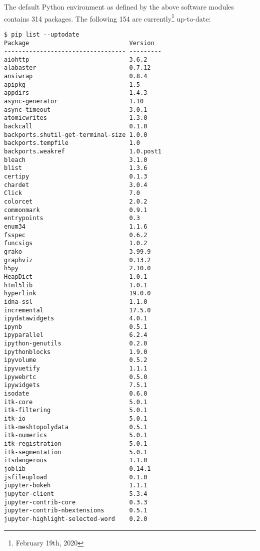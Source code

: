 \documentclass[11pt,a4paper]{article}
\begin{document}
The default Python environment as defined by the above software modules contains 314 packages.
The following 154 are currently\footnote{February 19th, 2020} up-to-date:
%
\begin{verbatim}
$ pip list --uptodate
Package                            Version
---------------------------------- ---------
aiohttp                            3.6.2
alabaster                          0.7.12
ansiwrap                           0.8.4
apipkg                             1.5
appdirs                            1.4.3
async-generator                    1.10
async-timeout                      3.0.1
atomicwrites                       1.3.0
backcall                           0.1.0
backports.shutil-get-terminal-size 1.0.0
backports.tempfile                 1.0
backports.weakref                  1.0.post1
bleach                             3.1.0
blist                              1.3.6
certipy                            0.1.3
chardet                            3.0.4
Click                              7.0
colorcet                           2.0.2
commonmark                         0.9.1
entrypoints                        0.3
enum34                             1.1.6
fsspec                             0.6.2
funcsigs                           1.0.2
grako                              3.99.9
graphviz                           0.13.2
h5py                               2.10.0
HeapDict                           1.0.1
html5lib                           1.0.1
hyperlink                          19.0.0
idna-ssl                           1.1.0
incremental                        17.5.0
ipydatawidgets                     4.0.1
ipynb                              0.5.1
ipyparallel                        6.2.4
ipython-genutils                   0.2.0
ipythonblocks                      1.9.0
ipyvolume                          0.5.2
ipyvuetify                         1.1.1
ipywebrtc                          0.5.0
ipywidgets                         7.5.1
isodate                            0.6.0
itk-core                           5.0.1
itk-filtering                      5.0.1
itk-io                             5.0.1
itk-meshtopolydata                 0.5.1
itk-numerics                       5.0.1
itk-registration                   5.0.1
itk-segmentation                   5.0.1
itsdangerous                       1.1.0
joblib                             0.14.1
jsfileupload                       0.1.0
jupyter-bokeh                      1.1.1
jupyter-client                     5.3.4
jupyter-contrib-core               0.3.3
jupyter-contrib-nbextensions       0.5.1
jupyter-highlight-selected-word    0.2.0

\end{verbatim}
\end{document}
